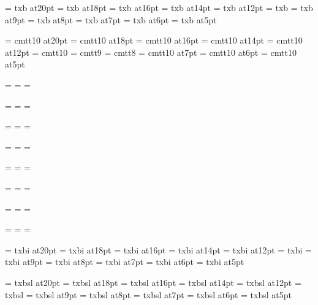 \font\twentybf=     txb at20pt
\font\eighteenbf=   txb at18pt
\font\sixteenbf=    txb at16pt
\font\fourteenbf=   txb at14pt
\font\twelvebf=     txb at12pt
\font\tenbf=        txb
\font\ninebf=       txb at9pt
\font\eightbf=      txb at8pt
\font\sevenbf=      txb at7pt
\font\sixbf=        txb at6pt
\font\fivebf=       txb at5pt

\font\twentytt=     cmtt10 at20pt
\font\eighteentt=   cmtt10 at18pt
\font\sixteentt=    cmtt10 at16pt
\font\fourteentt=   cmtt10 at14pt
\font\twelvett=     cmtt10 at12pt
\font\tentt=        cmtt10
\font\ninett=       cmtt9
\font\eighttt=      cmtt8
\font\seventt=      cmtt10 at7pt
\font\sixtt=        cmtt10 at6pt
\font\fivett=       cmtt10 at5pt




=\tenrm
{}=\sevenrm
{}=\fiverm
\def\rm{\fam=0 \tenrm}

=\teni
{}=\seveni
{}=\fivei
\def\mit{\fam=1}

=\tensy
{}=\sevensy
{}=\fivesy
\def\cal{\fam=2}

=\tenex
{}=\sevenex
{}=\fiveex


\def\it{\fam=\itfam \tenit}
\textfont\itfam=\tenit
\scriptfont\itfam=\sevenit
\scriptscriptfont\itfam=\fiveit

\def\sl{\fam=\slfam \tensl}
\textfont\slfam=\tensl
\scriptfont\slfam=\sevensl
\scriptscriptfont\slfam=\fivesl

\def\bf{\fam=\bffam \tenbf}
\textfont\bffam=\tenbf
\scriptfont\bffam=\sevenbf
\scriptscriptfont\bffam=\fivebf

\def\tt{\fam=\ttfam \tentt}
\textfont\ttfam=\tentt
\scriptfont\ttfam=\seventt
\scriptscriptfont\ttfam=\fivett

\font\twentyitbf=      txbi at20pt
\font\eighteenitbf=    txbi at18pt
\font\sixteenitbf=     txbi at16pt
\font\fourteenitbf=    txbi at14pt
\font\twelveitbf=      txbi at12pt
\font\itbf=            txbi
\font\nineitbf=        txbi at9pt
\font\eightitbf=       txbi at8pt
\font\sevenitbf=       txbi at7pt
\font\sixitbf=         txbi at6pt
\font\fiveitbf=        txbi at5pt

\font\twentyslbf=      txbsl at20pt
\font\eighteenslbf=    txbsl at18pt
\font\sixteenslbf=     txbsl at16pt
\font\fourteenslbf=    txbsl at14pt
\font\twelveslbf=      txbsl at12pt
\font\slbf=            txbsl
\font\nineslbf=        txbsl at9pt
\font\eightslbf=       txbsl at8pt
\font\sevenslbf=       txbsl at7pt
\font\sixslbf=         txbsl at6pt
\font\fiveslbf=        txbsl at5pt

